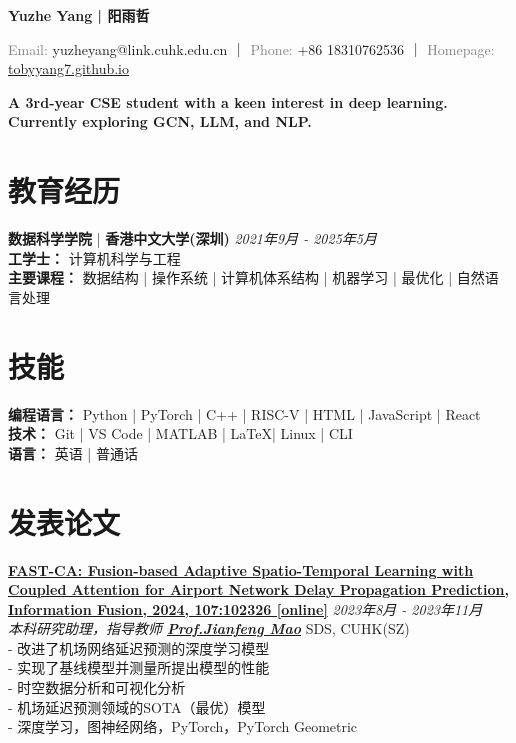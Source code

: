\documentclass[a4paper,10pt]{article}
\newcommand{\contact}[2]{\noindent\textcolor{gray}{#1:} #2}
\begin{document}
\newcommand{\name}[1]{\noindent\textbf{\LARGE #1}\vspace{0.5em}}

\begin{center}
    
\name{Yuzhe Yang | 阳雨哲}

\contact{Email}{yuzheyang@link.cuhk.edu.cn} ｜ \contact{Phone}{+86 18310762536} ｜ \contact{Homepage}{\href{https://tobyyang7.github.io/}{tobyyang7.github.io}}

\vspace*{.2em}
\textbf{A 3rd-year CSE student with a keen interest in deep learning. Currently exploring GCN, LLM, and NLP.\\}

\end{center}

\section*{教育经历}
\textbf{数据科学学院} | \textbf{香港中文大学(深圳)} \hfill \textit{2021年9月 - 2025年5月}\\
\textbf{工学士：} 计算机科学与工程\\
\textbf{主要课程：}
数据结构 | 操作系统 | 计算机体系结构 | 机器学习 | 最优化 | 自然语言处理

\section*{技能}
\textbf{编程语言：} Python | PyTorch | C++ | RISC-V | HTML | JavaScript | React\\
\textbf{技术：} Git | VS Code | MATLAB | \LaTeX | Linux | CLI\\
\textbf{语言：} 英语 | 普通话

\section*{发表论文}
\href{https://www.sciencedirect.com/science/article/pii/S1566253524001040}{\textbf{FAST-CA: Fusion-based Adaptive Spatio-Temporal Learning with Coupled Attention for Airport Network Delay Propagation Prediction, Information Fusion, 2024, 107:102326 [online]}} \hfill \textit{2023年8月 - 2023年11月}\\
\textit{本科研究助理，指导教师 \textbf{\href{https://sds.cuhk.edu.cn/en/teacher/268}{Prof.\@ Jianfeng Mao}}} \hfill SDS, CUHK(SZ)\\
- 改进了机场网络延迟预测的深度学习模型\\
- 实现了基线模型并测量所提出模型的性能\\
- 时空数据分析和可视化分析\\
- 机场延迟预测领域的SOTA（最优）模型\\
- 深度学习，图神经网络，PyTorch，PyTorch Geometric
\end{document}
